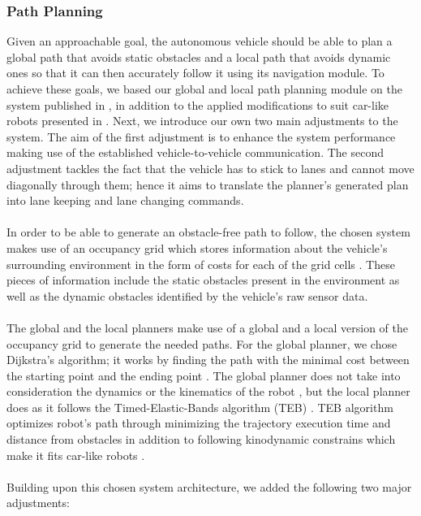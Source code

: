 \subsubsection{Path Planning}
\label{specs_path_plan}
Given an approachable goal, the autonomous vehicle should be able to plan a global path that avoids static obstacles and a local path that avoids dynamic ones so that it can then accurately follow it using its navigation module. To achieve these goals, we based our global and local path planning module on the system published in \cite{tbd}, in addition to the applied modifications to suit car-like robots presented in \cite{teblocalplanner}. Next, we introduce our own two main adjustments to the system. The aim of the first adjustment is to enhance the system performance making use of the established vehicle-to-vehicle communication. The second adjustment tackles the fact that the vehicle has to stick to lanes and cannot move diagonally through them; hence it aims to translate the planner’s generated plan into lane keeping and lane changing commands.
\\ \\
In order to be able to generate an obstacle-free path to follow, the chosen system makes use of an occupancy grid which stores information about the vehicle’s surrounding environment in the form of costs for each of the grid cells \cite{tbd}\cite{costmap}. These pieces of information include the static obstacles present in the environment as well as the dynamic obstacles identified by the vehicle’s raw sensor data.
\\ \\
The global and the local planners make use of a global and a local version of the occupancy grid to generate the needed paths. For the global planner, we chose Dijkstra's algorithm; it works by finding the path with the minimal cost between the starting point and the ending point \cite{baseglobalplanner}. The global planner does not take into consideration the dynamics or the kinematics of the robot \cite{tbd}, but the local planner does as it follows the Timed-Elastic-Bands algorithm (TEB) \cite{teblocalplanner}. TEB algorithm optimizes robot's path through minimizing the trajectory execution time and distance from obstacles in addition to following kinodynamic constrains which make it fits car-like robots \cite{teblocalplanner}.
\\ \\
Building upon this chosen system architecture, we added the following two major adjustments:
